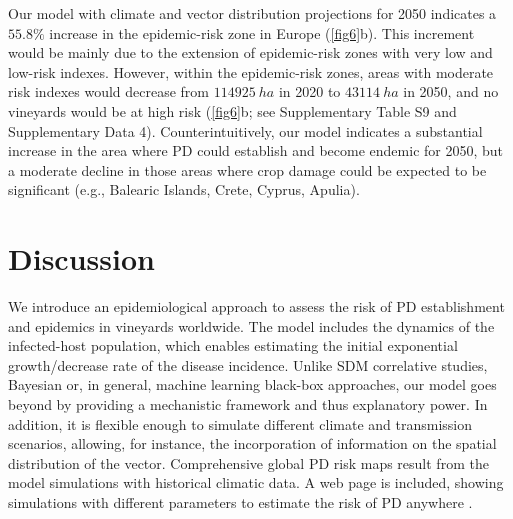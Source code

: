     Our model with climate and vector distribution projections for 2050
    indicates a
$ 55.8 \% $ increase in the epidemic-risk zone in Europe (\cref{fig6}b). This
    increment would be mainly due to the extension of epidemic-risk zones with
    very
    low and low-risk indexes. However, within the epidemic-risk zones, areas
    with
    moderate risk indexes would decrease from $\SI{114925}{ha}$ in 2020 to
$\SI{43114}{ha}$ in 2050, and no vineyards would be at high risk (\cref{fig6}b;
    see Supplementary Table S9 and Supplementary Data 4). Counterintuitively,
    our
    model indicates a substantial increase in the area where PD could establish
    and
    become endemic for 2050, but a moderate decline in those areas where crop
    damage could be expected to be significant (e.g., Balearic Islands, Crete,
    Cyprus, Apulia).

    \section{Discussion}

    We introduce an epidemiological approach to assess the risk of PD
    establishment
    and epidemics in vineyards worldwide. The model includes the dynamics of
    the
    infected-host population, which enables estimating the initial exponential
    growth/decrease rate of the disease incidence. Unlike SDM correlative
    studies,
    Bayesian or, in general, machine learning black-box approaches, our model
    goes
    beyond by providing a mechanistic framework and thus explanatory power. In
    addition, it is flexible enough to simulate different climate and
    transmission
    scenarios, allowing, for instance, the incorporation of information on the
    spatial distribution of the vector. Comprehensive global PD risk maps
    result
    from the model simulations with historical climatic data. A web page is
    included, showing simulations with different parameters to estimate the
    risk of
    PD anywhere \cite{Webpage}.

